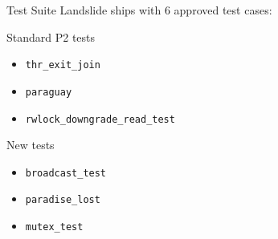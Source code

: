 \documentclass[xcolor=dvipsnames]{beamer}
\begin{document}
\begin{frame}{Test Suite}
	Landslide ships with 6 approved test cases:
	\linegap

	Standard P2 tests
	\begin{itemize}
		\item {\tt thr\_exit\_join}
		\item {\tt paraguay}
		\item {\tt rwlock\_downgrade\_read\_test}
	\end{itemize}

	New tests
	\begin{itemize}
		\item {\tt broadcast\_test}
		\item {\tt paradise\_lost} %
		\item {\tt mutex\_test} %
	\end{itemize}
\end{frame}

%
%
%
\end{document}
